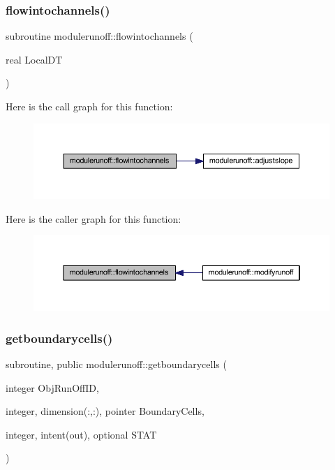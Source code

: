 \subsubsection{\texorpdfstring{flowintochannels()}{flowintochannels()}}
{\footnotesize\ttfamily subroutine modulerunoff\+::flowintochannels (\begin{DoxyParamCaption}\item[{real}]{Local\+DT }\end{DoxyParamCaption})\hspace{0.3cm}{\ttfamily [private]}}

Here is the call graph for this function\+:
\nopagebreak
\begin{figure}[H]
\begin{center}
\leavevmode
\includegraphics[width=350pt]{namespacemodulerunoff_a08312a51cf0c25b5c2019c42750e1673_cgraph}
\end{center}
\end{figure}
Here is the caller graph for this function\+:
\nopagebreak
\begin{figure}[H]
\begin{center}
\leavevmode
\includegraphics[width=350pt]{namespacemodulerunoff_a08312a51cf0c25b5c2019c42750e1673_icgraph}
\end{center}
\end{figure}
\mbox{\label{namespacemodulerunoff_a94d1c021f061e9cfa1f07c3845541525}} 
\subsubsection{\texorpdfstring{getboundarycells()}{getboundarycells()}}
{\footnotesize\ttfamily subroutine, public modulerunoff\+::getboundarycells (\begin{DoxyParamCaption}\item[{integer}]{Obj\+Run\+Off\+ID,  }\item[{integer, dimension(\+:,\+:), pointer}]{Boundary\+Cells,  }\item[{integer, intent(out), optional}]{S\+T\+AT }\end{DoxyParamCaption})}

